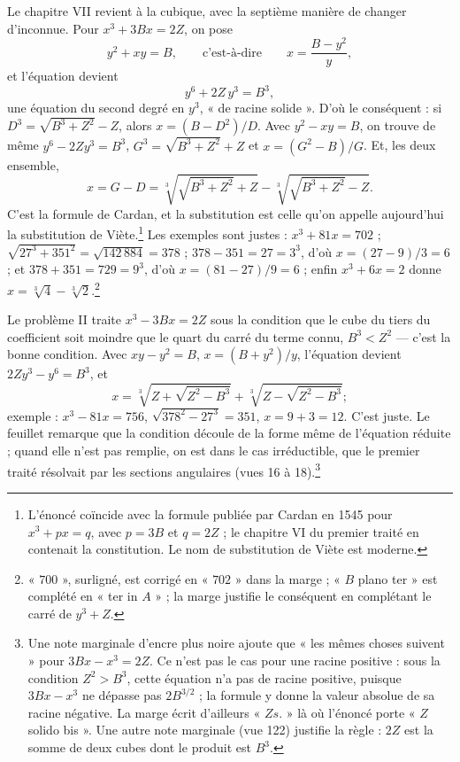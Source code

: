 \documentclass[11pt,a4paper]{article}
\begin{document}
Le chapitre VII revient à la cubique, avec la septième manière de changer
d'inconnue. Pour $x^3 + 3Bx = 2Z$, on pose
\[ y^2 + xy = B , \qquad\text{c'est-à-dire}\qquad x = \frac{B - y^2}{y} , \]
et l'équation devient
\[ y^6 + 2Z\,y^3 = B^3 , \]
une équation du second degré en $y^3$, « de racine solide ». D'où le
conséquent : si $D^3 = \sqrt{B^3 + Z^2} - Z$, alors $x = (B - D^2)/D$. Avec
$y^2 - xy = B$, on trouve de même $y^6 - 2Zy^3 = B^3$, $G^3 = \sqrt{B^3 + Z^2} + Z$
et $x = (G^2 - B)/G$. Et, les deux ensemble,
\[ x = G - D = \sqrt[3]{\sqrt{B^3 + Z^2} + Z} - \sqrt[3]{\sqrt{B^3 + Z^2} - Z} . \]
C'est la formule de Cardan, et la substitution est celle qu'on appelle
aujourd'hui la substitution de Viète.\footnote{L'énoncé coïncide avec la formule
publiée par Cardan en 1545 pour $x^3 + px = q$, avec $p = 3B$ et $q = 2Z$ ; le
chapitre VI du premier traité en contenait la constitution. Le nom de
substitution de Viète est moderne.} Les exemples sont justes :
$x^3 + 81x = 702$ ; $\sqrt{27^3 + 351^2} = \sqrt{142\,884} = 378$ ;
$378 - 351 = 27 = 3^3$, d'où $x = (27 - 9)/3 = 6$ ; et $378 + 351 = 729 = 9^3$,
d'où $x = (81 - 27)/9 = 6$ ; enfin $x^3 + 6x = 2$ donne
$x = \sqrt[3]{4} - \sqrt[3]{2}$.\footnote{« $700$ », surligné, est corrigé en
« $702$ » dans la marge ; « $B$ plano ter » est complété en « ter in $A$ » ; la
marge justifie le conséquent en complétant le carré de $y^3 + Z$.}

Le problème II traite $x^3 - 3Bx = 2Z$ sous la condition que le cube du tiers
du coefficient soit moindre que le quart du carré du terme connu, $B^3 < Z^2$ —
c'est la bonne condition. Avec $xy - y^2 = B$, $x = (B + y^2)/y$, l'équation
devient $2Zy^3 - y^6 = B^3$, et
\[ x = \sqrt[3]{Z + \sqrt{Z^2 - B^3}} + \sqrt[3]{Z - \sqrt{Z^2 - B^3}} ; \]
exemple : $x^3 - 81x = 756$, $\sqrt{378^2 - 27^3} = 351$, $x = 9 + 3 = 12$. C'est
juste. Le feuillet remarque que la condition découle de la forme même de
l'équation réduite ; quand elle n'est pas remplie, on est dans le cas
irréductible, que le premier traité résolvait par les sections angulaires
(vues 16 à 18).\footnote{Une note marginale d'encre plus noire ajoute que
« les mêmes choses suivent » pour $3Bx - x^3 = 2Z$. Ce n'est pas le cas pour une
racine positive : sous la condition $Z^2 > B^3$, cette équation n'a pas de racine
positive, puisque $3Bx - x^3$ ne dépasse pas $2B^{3/2}$ ; la formule y donne la
valeur absolue de sa racine négative. La marge écrit d'ailleurs « $Zs.$ » là où
l'énoncé porte « $Z$ solido bis ». Une autre note marginale (vue 122) justifie la
règle : $2Z$ est la somme de deux cubes dont le produit est $B^3$.}
\end{document}
